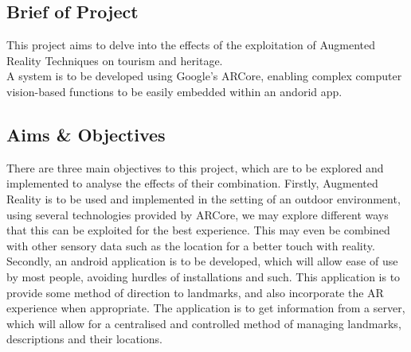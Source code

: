 \subsection{Brief of Project}
This project aims to delve into the effects of the exploitation of Augmented Reality Techniques on tourism and heritage.\\
A system is to be developed using Google's ARCore, enabling complex computer vision-based functions to be easily embedded within an andorid app. 
\subsection{Aims \& Objectives}
There are three main objectives to this project, which are to be explored and implemented to analyse the effects of their combination. 
Firstly,  Augmented Reality is to be used and implemented in the setting of an outdoor environment, using several technologies provided by ARCore,
we may explore different ways that this can be exploited for the best experience. This may even be combined with other sensory data such 
as the location for a better touch with reality. Secondly, an android application is to be developed, which will allow ease of use by most people, avoiding hurdles of 
installations and such. This application is to provide some method of direction to landmarks, and also incorporate the AR experience when 
appropriate. The application is to get information from a server, which will allow for a centralised and controlled method of managing 
landmarks, descriptions and their locations.   

